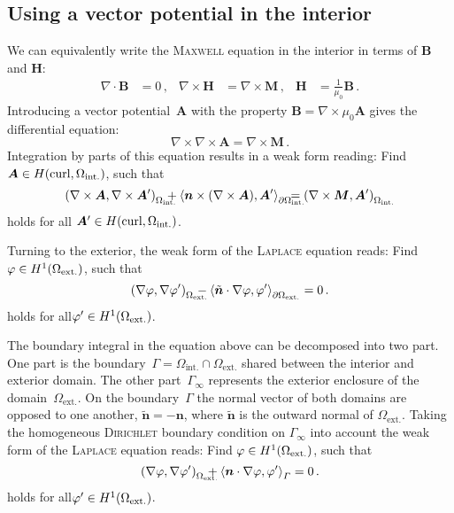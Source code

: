 \subsection*{Using a vector potential in the interior}
We can equivalently write the \textsc{Maxwell} equation in the interior in terms of $\bm{B}$ and $\bm{H}$:
\begin{equation}
\begin{aligned}
	\nabla\cdot\bm{B}&=0\,, & 
	\nabla\times\bm{H}&=\nabla\times\bm{M}\,, &
	\bm{H}&=\frac{1}{\mu_0}\bm{B}\,.
\end{aligned}
\end{equation}
Introducing a vector potential~$\bm{A}$ with the property $\bm{B}=\nabla\times\mu_0\bm{A}$ gives the differential equation:
\begin{equation}
	\nabla\times\nabla\times\bm{A}=\nabla\times\bm{M}\,.
\end{equation}
Integration by parts of this equation results in a weak form reading: Find $\bm{A}\in H(\operatorname{curl}, \Omega_\mathrm{int.})$, such that
\begin{equation}
	\label{eqn:WeakFormA}
	\left(\nabla\times\bm{A},\nabla\times\bm{A}'\right)_{\mathrlap{\Omega_\mathrm{int.}}\ \ }+\left\langle\bm{n}\times(\nabla\times\bm{A}),\bm{A}'\right\rangle_{\mathrlap{\p\Omega_\mathrm{int.}}\ \ }=\left(\nabla\times\bm{M},\bm{A}'\right)_{\Omega_\mathrm{int.}}
\end{equation}
holds for all $\bm{A}'\in H(\operatorname{curl}, \Omega_\mathrm{int.})$.

Turning to the exterior, the weak form of the \textsc{Laplace} equation reads: Find $\varphi\in H^1(\Omega_\mathrm{ext.})$, such that
\begin{equation}
	\left(\nabla\vp,\nabla\vp'\right)_{\mathrlap{\Omega_\mathrm{ext.}}\ \ }
	-\left\langle\tilde{\bm{n}}\cdot\nabla\vp,\vp'\right\rangle_{\p\Omega_\mathrm{ext.}}=0\,.
\end{equation}
holds for all$\varphi'\in H^1(\Omega_\mathrm{ext.})$.

The boundary integral in the equation above can be decomposed into two part. One part is the boundary~$\varGamma=\varOmega_\mathrm{int.}\cap\varOmega_\mathrm{ext.}$ shared between the interior and exterior domain. The other part~$\varGamma_\infty$ represents the exterior enclosure of the domain~$\varOmega_\mathrm{ext.}$. On the boundary~$\varGamma$ the normal vector of both domains are opposed to one another, \ie $\tilde{\bm{n}}=-\bm{n}$, where $\tilde{\bm{n}}$ is the outward normal of $\varOmega_\mathrm{ext.}$. Taking the homogeneous \textsc{Dirichlet} boundary condition on $\varGamma_\infty$ into account the weak form of the \textsc{Laplace} equation reads: Find $\varphi\in H^1(\Omega_\mathrm{ext.})$, such that
\begin{equation}
	\label{eqn:WeakFormPhi}
	\left(\nabla\vp,\nabla\vp'\right)_{\mathrlap{\Omega_\mathrm{ext.}}\ \ }
	+\left\langle\bm{n}\cdot\nabla\vp,\vp'\right\rangle_{\varGamma}=0\,.
\end{equation}
holds for all$\varphi'\in H^1(\Omega_\mathrm{ext.})$.

